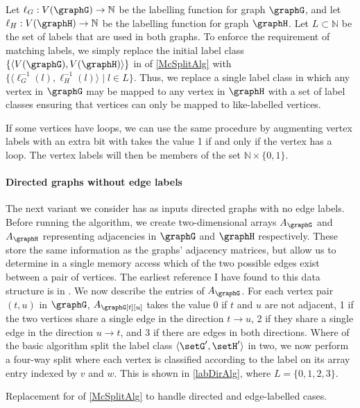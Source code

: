 Let $\ell_G: V(\graphG) \rightarrow \mathbb{N}$ be the labelling function for graph $\graphG$,
and let $\ell_H: V(\graphH) \rightarrow \mathbb{N}$ be the labelling function for graph $\graphH$.
Let $L \subset \mathbb{N}$ be the set of labels that are used in both graphs.
To enforce the requirement of matching labels, we simply
replace the initial label class $\{\langle V(\graphG),V(\graphH) \rangle\}$ in 
of \cref{McSplitAlg}
with $\{\langle \ell_G^{-1}(l), \ell_H^{-1}(l)\rangle \mid l \in L\}$.  Thus, we replace
a single label class in which any vertex in $\graphG$ may be mapped to any
vertex in $\graphH$ with a set of label classes ensuring that vertices can only
be mapped to like-labelled vertices.

If some vertices have loops, we can use the same procedure by augmenting vertex labels with an extra
bit with takes the value 1 if and only if the vertex has a loop.  The vertex labels will then
be members of the set $\mathbb{N} \times \{0,1\}$.

\paragraph{Directed graphs without edge labels} The next variant we consider has as inputs directed
graphs with no edge labels.
Before running the algorithm,
we create two-dimensional arrays $A_\graphG$ and $A_\graphH$ representing adjacencies in
$\graphG$ and $\graphH$ respectively.  These store the same information as the graphs'
adjacency matrices, but allow us to determine in a single memory access which of
the two possible edges exist between a pair of vertices.  The earliest reference I have
found to this data structure is in \cite{DBLP:conf/wea/Lopez-PresaA09}.
We now describe the entries of $A_\graphG$.
For each vertex pair $(t,u)$ in $\graphG$,
$A_\graphG[t][u]$ takes the value 0 if $t$ and $u$ are not
adjacent, 1 if the two vertices share a single edge in the direction $t
\rightarrow u$, 2 if they share a single edge in the direction $u \rightarrow
t$, and 3 if there are edges in both directions. Where
 of the basic algorithm split the
label class $\langle \setG',\setH' \rangle$ in two, we now perform a four-way split
where each vertex is classified according to the label on its array entry indexed by
$v$ and $w$.  This is shown in \cref{labDirAlg}, where
$L=\{0,1,2,3\}$.

\begin{algorithm}[htb]
\AlgorithmFontSizeB
\DontPrintSemicolon
\nl    {}
    \caption{Replacement for  of \cref{McSplitAlg} to handle directed and edge-labelled cases.}
\label{labDirAlg}
\end{algorithm}

